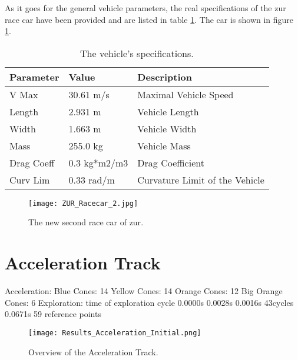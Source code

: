As it goes for the general vehicle parameters, the real specifications of the \acrshort{zur} race car have been provided and are listed in table \ref{tab:ZUR Vehicle Specifications}. The car is shown in figure \ref{fig:ZUR Racecar 2}.
\begin{table}[H]
    \centering
    \begin{tabular}{|l|l|l|}
        \hline
        \textbf{Parameter} & \textbf{Value} & \textbf{Description}           \\ \hline
        V Max              & 30.61 m/s      & Maximal Vehicle Speed          \\ \hline
        Length             & 2.931 m        & Vehicle Length                 \\ \hline
        Width              & 1.663 m        & Vehicle Width                  \\ \hline
        Mass               & 255.0 kg       & Vehicle Mass                   \\ \hline
        Drag Coeff         & 0.3 kg*m2/m3   & Drag Coefficient               \\ \hline
        Curv Lim           & 0.33 rad/m     & Curvature Limit of the Vehicle \\ \hline
    \end{tabular}
    \caption{The vehicle's specifications.}
    \label{tab:ZUR Vehicle Specifications}
\end{table}
\begin{figure}[H]
    \centering
    \texttt{[image: ZUR\_Racecar\_2.jpg]}
    \caption{The new second race car of \acrlong{zur}.}
    \label{fig:ZUR Racecar 2}
\end{figure}

\section{Acceleration Track} \label{sec:Results Acceleration Track}
Acceleration:
Blue Cones: 14
Yellow Cones: 14
Orange Cones: 12
Big Orange Cones: 6
Exploration:
time of exploration cycle
0.0000s 0.0028s 0.0016s 43cycles 0.0671s
59 reference points

\begin{figure}[H]
    \centering
    \texttt{[image: Results\_Acceleration\_Initial.png]}
    \caption{Overview of the Acceleration Track.}
    \label{fig:Results Acceleration Initial}
\end{figure}

